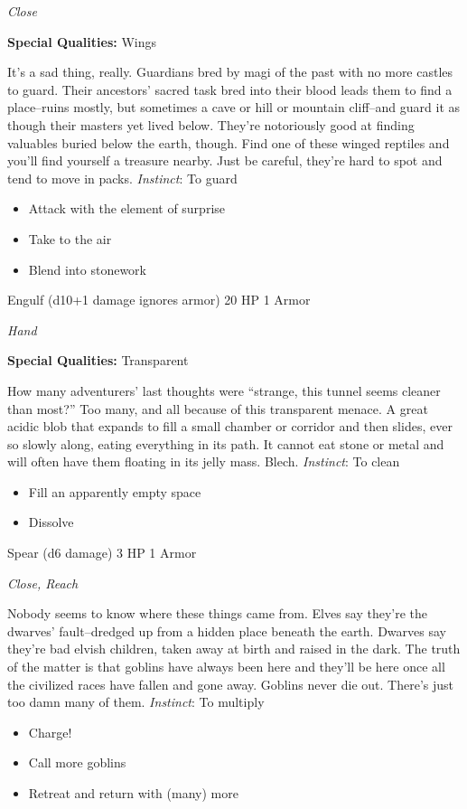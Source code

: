 \emph{Close}

\textbf{Special Qualities:}
Wings

\HRule
It's a sad thing, really. Guardians bred by magi of the past with no more castles to guard. Their ancestors' sacred task bred into their blood leads them to find a place--ruins mostly, but sometimes a cave or hill or mountain cliff--and guard it as though their masters yet lived below. They're notoriously good at finding valuables buried below the earth, though. Find one of these winged reptiles and you'll find yourself a treasure nearby. Just be careful, they're hard to spot and tend to move in packs. \emph{Instinct}: To guard
\begin{itemize}
\item Attack with the element of surprise
\item Take to the air
\item Blend into stonework
\end{itemize}

\newpage
\HRule
{}

Engulf (d10+1 damage ignores armor) \hspace*{\fill}20 HP 1 Armor

\emph{Hand}

\textbf{Special Qualities:}
Transparent

\HRule
How many adventurers' last thoughts were ``strange, this tunnel seems cleaner than most?'' Too many, and all because of this transparent menace. A great acidic blob that expands to fill a small chamber or corridor and then slides, ever so slowly along, eating everything in its path. It cannot eat stone or metal and will often have them floating in its jelly mass. Blech. \emph{Instinct}: To clean
\begin{itemize}
\item Fill an apparently empty space
\item Dissolve
\end{itemize}

\HRule
{}

Spear (d6 damage) \hspace*{\fill}3 HP 1 Armor

\emph{Close, Reach}

\HRule
Nobody seems to know where these things came from. Elves say they're the dwarves' fault--dredged up from a hidden place beneath the earth. Dwarves say they're bad elvish children, taken away at birth and raised in the dark. The truth of the matter is that goblins have always been here and they'll be here once all the civilized races have fallen and gone away. Goblins never die out. There's just too damn many of them. \emph{Instinct}: To multiply
\begin{itemize}
\item Charge!
\item Call more goblins
\item Retreat and return with (many) more
\end{itemize}

